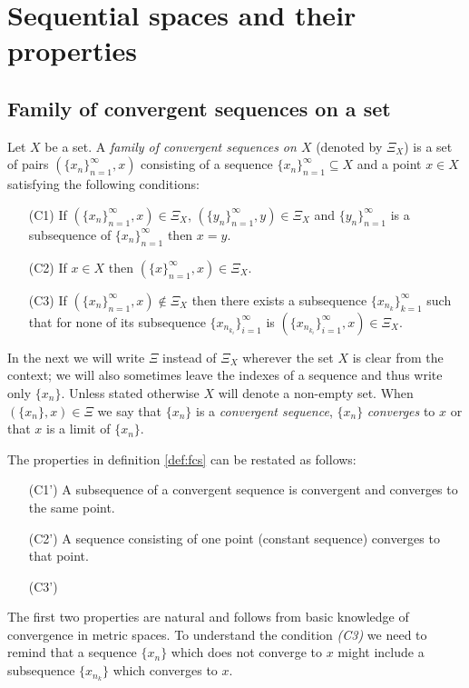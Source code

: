 \chapter{Sequential spaces and their properties} 

\section{Family of convergent sequences on a set}

\begin{define}\label{def:fcs}
Let $X$ be a set. A \emph{family of convergent sequences on $X$} (denoted by $\Xi_X$) is a set of pairs $(\{x_n\}^\infty_{n=1},x)$ consisting of a sequence $\{x_n\}^\infty_{n=1}\subseteq X$ and a point $x\in X$ satisfying the following conditions:
\begin{enumerate}
	\item[(C1)] If $(\{x_n\}^\infty_{n=1},x)\in\Xi_X$, $(\{y_n\}^\infty_{n=1},y)\in\Xi_X$ and $\{y_n\}^\infty_{n=1}$ is a subsequence of $\{x_n\}^\infty_{n=1}$ then $x=y$.
	\item[(C2)] If $x\in X$ then $(\{x\}^\infty_{n=1},x)\in\Xi_X$.
	\item[(C3)] If  $(\{x_n\}^\infty_{n=1},x)\notin\Xi_X$ then there exists a subsequence $\{x_{n_k}\}^\infty_{k=1}$ such that for none of its subsequence $\{x_{n_{k_i}}\}^\infty_{i=1}$ is $(\{x_{n_{k_i}}\}^\infty_{i=1},x)\in\Xi_X$.
\end{enumerate}
\end{define}

In the next we will write $\Xi$ instead of $\Xi_X$ wherever the set $X$ is clear from the context; we will also sometimes leave the indexes of a sequence and thus write only $\{x_n\}$. Unless stated otherwise $X$ will denote a non-empty set. When $(\{x_n\},x)\in\Xi$ we say that $\{x_n\}$ is  a \emph{convergent sequence}, $\{x_n\}$ \emph{converges} to $x$ or that $x$ is a limit of  $\{x_n\}$.

The properties in definition \ref{def:fcs} can be restated as follows:
\begin{enumerate}
	\item[(C1')] A subsequence of a convergent sequence is convergent and converges to the same point.
	\item[(C2')] A sequence consisting of one point (constant sequence) converges to that point.
	\item[(C3')] \color{blue}{A non-convengent sequence (that is not converging to point $x$) contains a subsequence such that any of its subsequences either converges to different point (not to $x$) or does not convergent at all.}
\end{enumerate}
The first two properties are natural and follows from basic knowledge of convergence in metric spaces. To understand the condition \emph{(C3)} we need to remind that a sequence $\{x_n\}$ which does not converge to $x$ might include a subsequence $\{x_{n_k}\}$ which converges to $x$.

